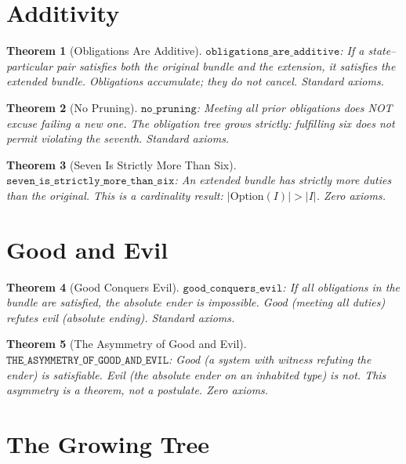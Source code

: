 \documentclass[12pt,a4paper]{article}
\newtheorem{theorem}{Theorem}[section]
\begin{document}
\section{Additivity}

\begin{theorem}[Obligations Are Additive]\label{thm:additive}
$\texttt{obligations\_are\_additive}$: If a state--particular pair satisfies
both the original bundle and the extension, it satisfies the extended bundle.
Obligations accumulate; they do not cancel. Standard axioms.
\end{theorem}

\begin{theorem}[No Pruning]\label{thm:no-pruning}
$\texttt{no\_pruning}$: Meeting all prior obligations does NOT excuse failing
a new one. The obligation tree grows strictly: fulfilling six does not permit
violating the seventh. Standard axioms.
\end{theorem}

\begin{theorem}[Seven Is Strictly More Than Six]\label{thm:seven}
$\texttt{seven\_is\_strictly\_more\_than\_six}$: An extended bundle has
strictly more duties than the original. This is a cardinality result:
$|\text{Option}(I)| > |I|$. Zero axioms.
\end{theorem}

\section{Good and Evil}

\begin{theorem}[Good Conquers Evil]\label{thm:good}
$\texttt{good\_conquers\_evil}$: If all obligations in the bundle are
satisfied, the absolute ender is impossible. Good (meeting all duties)
refutes evil (absolute ending). Standard axioms.
\end{theorem}

\begin{theorem}[The Asymmetry of Good and Evil]\label{thm:asymmetry}
$\texttt{THE\_ASYMMETRY\_OF\_GOOD\_AND\_EVIL}$: Good (a system with witness
refuting the ender) is satisfiable. Evil (the absolute ender on an inhabited
type) is not. This asymmetry is a theorem, not a postulate. Zero axioms.
\end{theorem}

\section{The Growing Tree}
\end{document}
